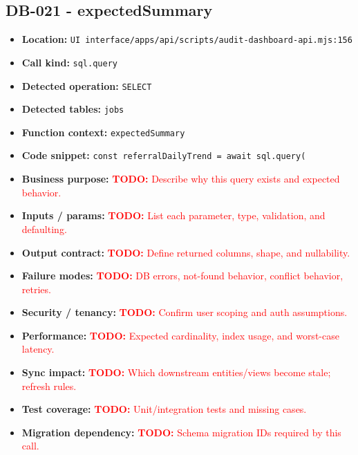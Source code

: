 \documentclass[11pt]{article}
\newcommand{\todoitem}[1]{\textcolor{red}{\textbf{TODO:} #1}}
\begin{document}
\subsection{DB-021 - expectedSummary}
\begin{itemize}[leftmargin=1.5em]
\item \textbf{Location:} \texttt{UI interface/apps/api/scripts/audit-dashboard-api.mjs:156}
\item \textbf{Call kind:} \texttt{sql.query}
\item \textbf{Detected operation:} \texttt{SELECT}
\item \textbf{Detected tables:} \texttt{jobs}
\item \textbf{Function context:} \texttt{expectedSummary}
\item \textbf{Code snippet:} \texttt{const referralDailyTrend = await sql.query(}
\item \textbf{Business purpose:} \todoitem{Describe why this query exists and expected behavior.}
\item \textbf{Inputs / params:} \todoitem{List each parameter, type, validation, and defaulting.}
\item \textbf{Output contract:} \todoitem{Define returned columns, shape, and nullability.}
\item \textbf{Failure modes:} \todoitem{DB errors, not-found behavior, conflict behavior, retries.}
\item \textbf{Security / tenancy:} \todoitem{Confirm user scoping and auth assumptions.}
\item \textbf{Performance:} \todoitem{Expected cardinality, index usage, and worst-case latency.}
\item \textbf{Sync impact:} \todoitem{Which downstream entities/views become stale; refresh rules.}
\item \textbf{Test coverage:} \todoitem{Unit/integration tests and missing cases.}
\item \textbf{Migration dependency:} \todoitem{Schema migration IDs required by this call.}
\end{itemize}
\end{document}
